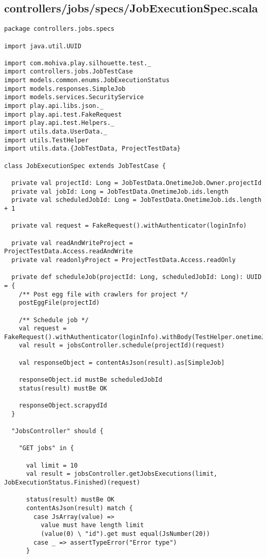 \subsection{controllers/jobs/specs/JobExecutionSpec.scala}
\begin{lstlisting}
package controllers.jobs.specs

import java.util.UUID

import com.mohiva.play.silhouette.test._
import controllers.jobs.JobTestCase
import models.common.enums.JobExecutionStatus
import models.responses.SimpleJob
import models.services.SecurityService
import play.api.libs.json._
import play.api.test.FakeRequest
import play.api.test.Helpers._
import utils.data.UserData._
import utils.TestHelper
import utils.data.{JobTestData, ProjectTestData}

class JobExecutionSpec extends JobTestCase {

  private val projectId: Long = JobTestData.OnetimeJob.Owner.projectId
  private val jobId: Long = JobTestData.OnetimeJob.ids.length
  private val scheduledJobId: Long = JobTestData.OnetimeJob.ids.length + 1

  private val request = FakeRequest().withAuthenticator(loginInfo)

  private val readAndWriteProject = ProjectTestData.Access.readAndWrite
  private val readonlyProject = ProjectTestData.Access.readOnly

  private def scheduleJob(projectId: Long, scheduledJobId: Long): UUID = {
    /** Post egg file with crawlers for project */
    postEggFile(projectId)

    /** Schedule job */
    val request = FakeRequest().withAuthenticator(loginInfo).withBody(TestHelper.onetimeJobForm)
    val result = jobsController.schedule(projectId)(request)

    val responseObject = contentAsJson(result).as[SimpleJob]

    responseObject.id mustBe scheduledJobId
    status(result) mustBe OK

    responseObject.scrapydId
  }

  "JobsController" should {

    "GET jobs" in {

      val limit = 10
      val result = jobsController.getJobsExecutions(limit, JobExecutionStatus.Finished)(request)

      status(result) mustBe OK
      contentAsJson(result) match {
        case JsArray(value) =>
          value must have length limit
          (value(0) \ "id").get must equal(JsNumber(20))
        case _ => assertTypeError("Error type")
      }


\end{lstlisting}
